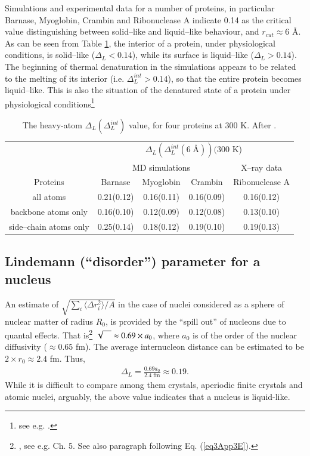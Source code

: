 \begin{subappendices}
Simulations and experimental data for a number of proteins, in particular Barnase, Myoglobin, Crambin and Ribonuclease A indicate 0.14 as the critical value distinguishing between solid--like and liquid--like behaviour, and $r_{cut}\approx 6$ \AA. As can be seen from Table \ref{tab2C1}, the interior of a protein, under physiological conditions, is solid--like  ($\Delta_L<0.14$), while its surface is liquid--like ($\Delta_L>0.14$). The beginning of thermal denaturation in the simulations appears to be related to the melting of its interior (i.e. $\Delta^{int}_L>0.14$), so that the entire protein becomes liquid--like. This is also the situation of the denatured state of a protein under physiological conditions\footnote{see e.g. \cite{Rosner:17}.} 



\begin{table}[h]
 \begin{tabular}{|c|c|c|c|c|}
 \hline
 &\multicolumn{4}{|c|}{$\Delta_L(\Delta_L^{int}(6\;\text{\AA}))(300$ K)}\\
 \cline{2-5}
 &\multicolumn{3}{|c|}{MD simulations}&X--ray data\\
 \hline
 Proteins&Barnase&Myoglobin&Crambin&Ribonuclease A\\
 \hline
 all atoms&0.21(0.12)&0.16(0.11)&0.16(0.09)&0.16(0.12)\\
 backbone atoms only&0.16(0.10)&0.12(0.09)&0.12(0.08)&0.13(0.10)\\
 side--chain atoms only&0.25(0.14)&0.18(0.12)&0.19(0.10)&0.19(0.13)\\
 \hline
 \end{tabular}
 \caption{The heavy-atom $\Delta_L(\Delta_L^{int})$ value, for four proteins at 300 K. After \cite{Zhou:99}.}\label{tab2C1}
 \end{table}

\subsection{Lindemann (``disorder'') parameter for a nucleus}
An estimate of  $\sqrt{\sum_i\langle \Delta r_i^2\rangle/A}$ in the case of nuclei considered as a sphere of nuclear matter of radius $R_0$, is provided by the ``spill out'' of nucleons due to quantal effects. That is\footnote{\cite{Bertsch:05}, see e.g. Ch. 5. See also paragraph following Eq. (\ref{eq3App3E}).} $\sqrt{\vphantom{\Sigma}\quad}\approx 0.69\times a_0$, where $a_0$ is of the order of the nuclear diffusivity  ($\approx 0.65$ fm).
The average internucleon distance can be estimated to be $2\times r_0\approx 2.4$ fm. Thus,
\begin{align}
\Delta_L=\frac{0.69 a_0}{2.4\;\text{fm}}\approx0.19.
\end{align} 
While it is difficult to compare among them crystals, aperiodic finite crystals and atomic nuclei, arguably, the above value indicates that a nucleus is liquid-like. 

\end{subappendices}
